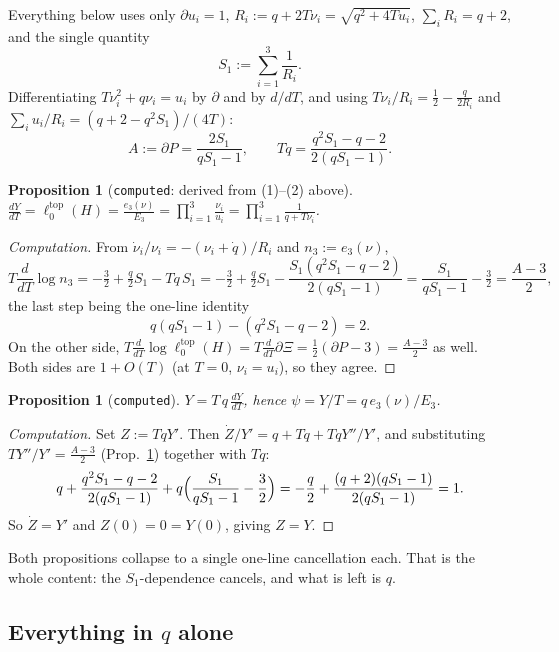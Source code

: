 \documentclass[11pt,a4paper]{article}
\newcommand{\ltop}{\ell^{\mathrm{top}}}
\theoremstyle{plain}
\newtheorem{proposition}[theorem]{Proposition}
\theoremstyle{definition}
\begin{document}
Everything below uses only $\partial u_i=1$, $R_i:=q+2T\nu_i=\sqrt{q^2+4Tu_i}$,
$\sum_iR_i=q+2$, and the single quantity
\[
S_1:=\sum_{i=1}^3\frac1{R_i}.
\]
Differentiating $T\nu_i^2+q\nu_i=u_i$ by $\partial$ and by $d/dT$, and using
$T\nu_i/R_i=\tfrac12-\tfrac{q}{2R_i}$ and $\sum_iu_i/R_i=(q+2-q^2S_1)/(4T)$:
\[
A:=\partial P=\frac{2S_1}{qS_1-1},\qquad
T\dot q=\frac{q^2S_1-q-2}{2(qS_1-1)} .
\]

\begin{proposition}[\texttt{computed}: derived from (1)--(2) above]
\label{prop:dydt}
$\displaystyle \frac{dY}{dT}=\ltop_0(H)=\frac{e_3(\nu)}{E_3}
=\prod_{i=1}^3\frac{\nu_i}{u_i}=\prod_{i=1}^3\frac1{q+T\nu_i}$.
\end{proposition}

\begin{proof}[Computation]
From $\dot\nu_i/\nu_i=-(\nu_i+\dot q)/R_i$ and $n_3:=e_3(\nu)$,
\[
T\frac{d}{dT}\log n_3=-\tfrac32+\tfrac q2S_1-T\dot q\,S_1
=-\tfrac32+\tfrac q2S_1-\frac{S_1(q^2S_1-q-2)}{2(qS_1-1)}
=\frac{S_1}{qS_1-1}-\tfrac32=\frac{A-3}{2},
\]
the last step being the one-line identity
\[
q(qS_1-1)-(q^2S_1-q-2)=2 .
\]
On the other side, $T\frac{d}{dT}\log\ltop_0(H)=T\frac{d}{dT}\partial\Xi
=\tfrac12(\partial P-3)=\tfrac{A-3}{2}$ as well. Both sides are $1+O(T)$ (at $T=0$,
$\nu_i=u_i$), so they agree.
\end{proof}

\begin{proposition}[\texttt{computed}]
\label{prop:YTqY}
$\displaystyle Y=T\,q\,\frac{dY}{dT}$, hence $\psi=Y/T=q\,e_3(\nu)/E_3$.
\end{proposition}

\begin{proof}[Computation]
Set $Z:=TqY'$. Then $\dot Z/Y'=q+T\dot q+TqY''/Y'$, and substituting
$TY''/Y'=\tfrac{A-3}{2}$ (Prop.~\ref{prop:dydt}) together with $T\dot q$:
\[
q+\frac{q^2S_1-q-2}{2(qS_1-1)}+q\Bigl(\frac{S_1}{qS_1-1}-\frac32\Bigr)
=-\frac q2+\frac{(q+2)(qS_1-1)}{2(qS_1-1)}=1 .
\]
So $\dot Z=Y'$ and $Z(0)=0=Y(0)$, giving $Z=Y$.
\end{proof}

Both propositions collapse to a single one-line cancellation each. That is the whole content:
the $S_1$-dependence cancels, and what is left is $q$.

\subsection{Everything in $q$ alone}
\end{document}
